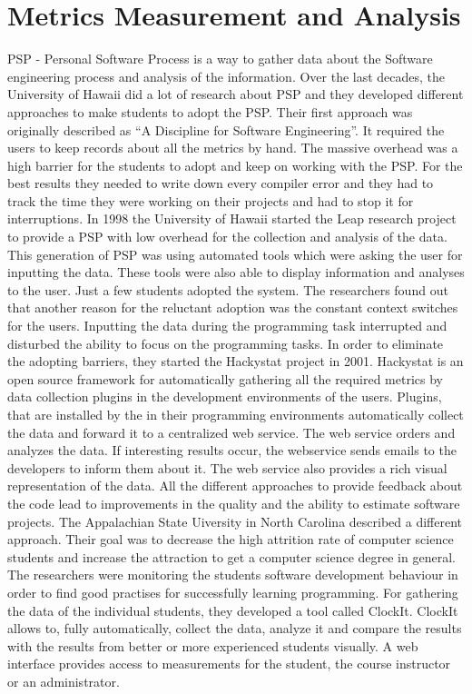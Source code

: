 \section{Metrics Measurement and Analysis}
PSP - Personal Software Process is a way to gather data about the Software engineering process and analysis of the information.
Over the last decades, the University of Hawaii did a lot of research about PSP and they developed different approaches to make students to adopt the PSP.
Their first approach was originally described as “A Discipline for Software Engineering”. It required the users to keep records about all the metrics by hand. The massive overhead was a high barrier for the students to adopt and keep on working with the PSP. For the best results they needed to write down every compiler error and they had to track the time they were working on their projects and had to stop it for interruptions. 
In 1998 the University of Hawaii started the Leap research project to provide a PSP with low overhead for the collection and analysis of the data. This generation of PSP was using automated tools which were asking the user for inputting the data. These tools were also able to display information and analyses to the user.
Just a few students adopted the system. The researchers found out that another reason for the reluctant adoption was the constant context switches for the users. Inputting the data during the programming task interrupted and disturbed the ability to focus on the programming tasks. \cite{johnson2003beyond}
In order to eliminate the adopting barriers, they started the Hackystat project in 2001. Hackystat is an open source framework for automatically gathering all the required metrics by data collection plugins in the development environments of the users. 
Plugins, that are installed by the in their programming environments automatically collect the data and forward it to a centralized web service. The web service orders and analyzes the data. If interesting results occur, the webservice sends emails to the developers to inform them about it. The web service also provides a rich visual representation of the data.
All the different approaches to provide feedback about the code lead to improvements in the quality and the ability to estimate software projects. \cite{johnson2001project} 
The Appalachian State Uiversity in North Carolina described a different approach. Their goal was to decrease the high attrition rate of computer science students and increase the attraction to get a computer science degree in general.
The researchers were monitoring the students software development behaviour in order to find good practises for successfully learning programming. For gathering the data of the individual students, they developed a tool called ClockIt. ClockIt allows to, fully automatically, collect the data, analyze it and compare the results with the results from better or more experienced students visually. A web interface provides access to measurements for the student, the course instructor or an administrator.
